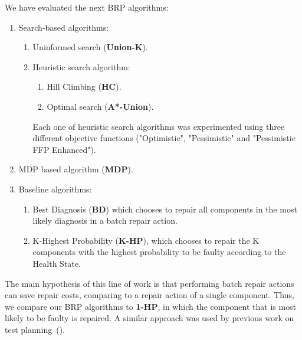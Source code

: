 \documentclass[review]{elsarticle}
\newcommand\meir[1]{\textcolor{red}{meir: #1}}
\begin{document}


We have evaluated the next BRP algorithms:
\begin{enumerate}
\item Search-based algorithms: 
\begin{enumerate}
\item Uninformed search ({\bf Union-K}). 
\item Heuristic search algorithm:
\begin{enumerate} 
\item Hill Climbing ({\bf HC}).
\item Optimal search ({\bf A*-Union}).
\end{enumerate}
Each one of heuristic search algorithms was experimented using three different objective functions ("Optimistic", "Pessimistic" and "Pessimistic FFP Enhanced"). 
\end{enumerate}
\item MDP based algorithm ({\bf MDP}).
\item Baseline algorithms: 
\begin{enumerate} 
\item Best Diagnosis ({\bf BD}) which chooses to repair all components in the most likely diagnosis in a batch repair action. 
\item K-Highest Probability ({\bf K-HP}), which chooses to repair the K components with the highest probability to be faulty according to the Health State.
\end{enumerate}
\end{enumerate}

The main hypothesis of this line of work is that performing batch repair actions can save repair costs, comparing to a repair action of a single component. Thus, we compare our BRP algorithms to {\bf 1-HP}, in which the component that is most likely to be faulty is repaired. A similar approach was used by previous work on test planning~(\cite{zamir2014using}). 
\end{document}
